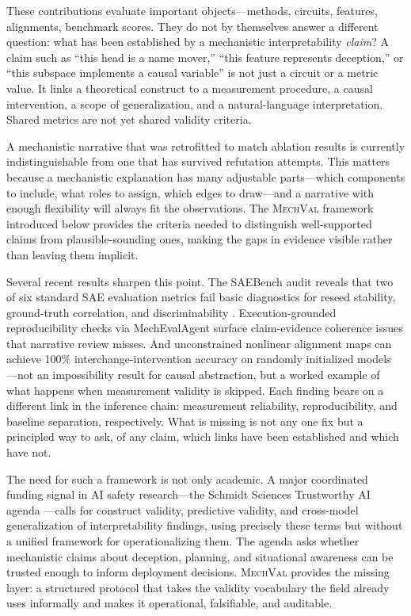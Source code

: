 \documentclass[10pt]{article}
\newcommand{\mechval}{\textsc{MechVal}}
\begin{document}
These contributions evaluate important objects---methods, circuits, features, alignments,
benchmark scores. They do not by themselves answer a different question: what has been
established by a mechanistic interpretability \emph{claim}? A claim such as ``this head is
a name mover,'' ``this feature represents deception,'' or ``this subspace implements a
causal variable'' is not just a circuit or a metric value. It links a theoretical
construct to a measurement procedure, a causal intervention, a scope of generalization,
and a natural-language interpretation. Shared metrics are not yet shared validity criteria.

A mechanistic narrative that was retrofitted to match ablation results is currently
indistinguishable from one that has survived refutation attempts. This matters because a
mechanistic explanation has many adjustable parts---which components to include, what roles
to assign, which edges to draw---and a narrative with enough flexibility will always fit
the observations. The \mechval{} framework introduced below provides the criteria needed to
distinguish well-supported claims from plausible-sounding ones, making the gaps in evidence
visible rather than leaving them implicit.

Several recent results sharpen this point. The SAEBench audit reveals that two of six
standard SAE evaluation metrics fail basic diagnostics for reseed stability, ground-truth
correlation, and discriminability \citep{karvonen2025saebench}. Execution-grounded
reproducibility checks via MechEvalAgent \citep{bai2026mecheval} surface claim-evidence
coherence issues that narrative review misses. And unconstrained nonlinear alignment maps can achieve 100\% interchange-intervention
accuracy on randomly initialized models \citep{sutter2025nonlinear}---not an impossibility
result for causal abstraction, but a worked example of what happens when measurement
validity is skipped. Each finding bears on a different link in the inference chain: measurement
reliability, reproducibility, and baseline separation, respectively. What is missing is
not any one fix but a principled way to ask, of any claim, which links have been
established and which have not.

The need for such a framework is not only academic.  A major coordinated funding signal in AI safety research---the Schmidt Sciences Trustworthy AI agenda \citep{schmidt2026trustworthy}---calls for construct validity, predictive validity, and cross-model generalization of interpretability findings, using precisely these terms but without a unified framework for operationalizing them.  The agenda asks whether mechanistic claims about deception, planning, and situational awareness can be trusted enough to inform deployment decisions.  \mechval{} provides the missing layer: a structured protocol that takes the validity vocabulary the field already uses informally and makes it operational, falsifiable, and auditable.
\end{document}
